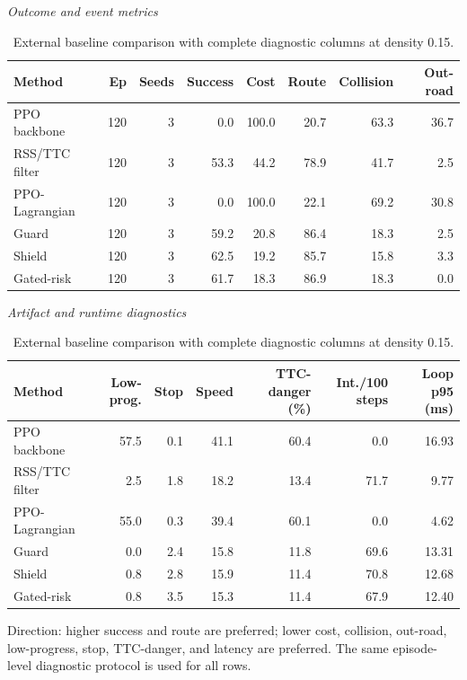 \begin{table}[!htbp]
\centering
\caption{External baseline comparison with complete diagnostic columns at density 0.15.}
\label{tab_external}
\scriptsize
\setlength{\tabcolsep}{3.2pt}
\renewcommand{\arraystretch}{1.08}
\textit{Outcome and event metrics}\par
\begin{tabular}{@{}lrrrrrrr@{}}
\toprule
Method & Ep & Seeds & Success & Cost & Route & Collision & Out-road \\
\midrule
PPO backbone & 120 & 3 & 0.0 & 100.0 & 20.7 & 63.3 & 36.7 \\
RSS/TTC filter & 120 & 3 & 53.3 & 44.2 & 78.9 & 41.7 & 2.5 \\
PPO-Lagrangian & 120 & 3 & 0.0 & 100.0 & 22.1 & 69.2 & 30.8 \\
Guard & 120 & 3 & 59.2 & 20.8 & 86.4 & 18.3 & 2.5 \\
Shield & 120 & 3 & 62.5 & 19.2 & 85.7 & 15.8 & 3.3 \\
Gated-risk & 120 & 3 & 61.7 & 18.3 & 86.9 & 18.3 & 0.0 \\
\bottomrule
\end{tabular}
\vspace{3pt}
\textit{Artifact and runtime diagnostics}\par
\begin{tabular}{@{}lrrrrrr@{}}
\toprule
Method & Low-prog. & Stop & Speed & TTC-danger (\%) & Int./100 steps & Loop p95 (ms) \\
\midrule
PPO backbone & 57.5 & 0.1 & 41.1 & 60.4 & 0.0 & 16.93 \\
RSS/TTC filter & 2.5 & 1.8 & 18.2 & 13.4 & 71.7 & 9.77 \\
PPO-Lagrangian & 55.0 & 0.3 & 39.4 & 60.1 & 0.0 & 4.62 \\
Guard & 0.0 & 2.4 & 15.8 & 11.8 & 69.6 & 13.31 \\
Shield & 0.8 & 2.8 & 15.9 & 11.4 & 70.8 & 12.68 \\
Gated-risk & 0.8 & 3.5 & 15.3 & 11.4 & 67.9 & 12.40 \\
\bottomrule
\end{tabular}
\begin{tablenotes}
\item Direction: higher success and route are preferred; lower cost, collision, out-road, low-progress, stop, TTC-danger, and latency are preferred. The same episode-level diagnostic protocol is used for all rows.
\end{tablenotes}
\end{table}
